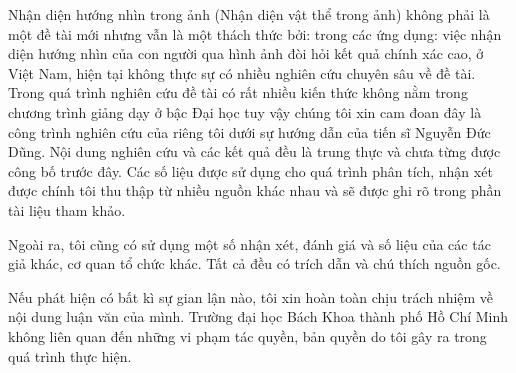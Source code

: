 \documentclass[13pt,a4paper,twoside]{book} %
\begin{document}
\fontsize{13}{1.25}\selectfont


\coverpage

\frontmatter


\begin{declaration}
	Nhận diện hướng nhìn trong ảnh (Nhận diện vật thể trong ảnh) không phải là một đề tài mới nhưng vẫn là một thách thức bởi: trong các ứng dụng: việc nhận diện hướng nhìn của con người qua hình ảnh đòi hỏi kết quả chính xác cao, ở Việt Nam, hiện tại không  thực sự có nhiều nghiên cứu chuyên sâu về đề tài. Trong quá trình nghiên cứu đề tài có rất nhiều kiến thức không nằm trong chương trình giảng dạy ở bậc Đại học tuy vậy chúng tôi xin cam đoan đây là công trình nghiên cứu của riêng tôi dưới sự hướng dẫn của tiến sĩ Nguyễn Đức Dũng. Nội dung nghiên cứu và các kết quả đều là trung thực và chưa từng được công bố trước đây. Các số liệu được sử dụng cho quá trình phân tích, nhận xét được chính tôi thu thập từ nhiều nguồn khác nhau và sẽ được ghi rõ trong phần tài liệu tham khảo.

	Ngoài ra, tôi cũng có sử dụng một số nhận xét, đánh giá và số liệu của các tác giả khác, cơ quan tổ chức khác. Tất cả đều có trích dẫn và chú thích nguồn gốc.

	Nếu phát hiện có bất kì sự gian lận nào, tôi xin hoàn toàn chịu trách nhiệm về nội dung luận văn của mình. Trường đại học Bách Khoa thành phố Hồ Chí Minh không liên quan đến những vi phạm tác quyền, bản quyền do tôi gây ra trong quá trình thực hiện.

\end{declaration}

\tableofcontents
\listoffigures


\mainmatter

\fancyhead{}  %

\pagestyle{header-footer}
%


% 
% 
% 
% 
\end{document}
